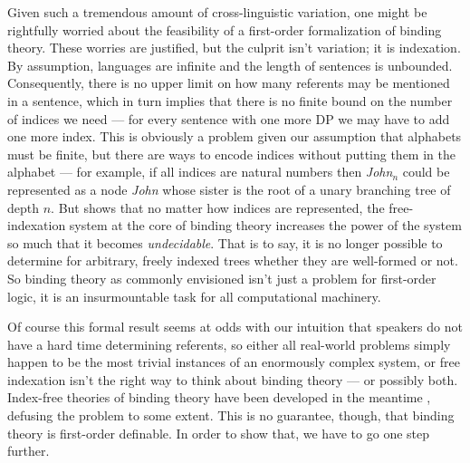 Given such a tremendous amount of cross-linguistic variation, one might be rightfully worried about the feasibility of a first-order formalization of binding theory.
These worries are justified, but the culprit isn't variation; it is indexation.
By assumption, languages are infinite and the length of sentences is unbounded.
Consequently, there is no upper limit on how many referents may be mentioned in a sentence, which in turn implies that there is no finite bound on the number of indices we need --- for every sentence with one more DP we may have to add one more index.
This is obviously a problem given our assumption that alphabets must be finite, but there are ways to encode indices without putting them in the alphabet --- for example, if all indices are natural numbers then \emph{John$_n$} could be represented as a node \emph{John} whose sister is the root of a unary branching tree of depth $n$.
But \citet{Rogers98} shows that no matter how indices are represented, the free-indexation system at the core of binding theory increases the power of the system so much that it becomes \emph{undecidable}.
That is to say, it is no longer possible to determine for arbitrary, freely indexed trees whether they are well-formed or not.
So binding theory as commonly envisioned isn't just a problem for first-order logic, it is an insurmountable task for all computational machinery.

Of course this formal result seems at odds with our intuition that speakers do not have a hard time determining referents, so either all real-world problems simply happen to be the most trivial instances of an enormously complex system, or free indexation isn't the right way to think about binding theory --- or possibly both.
Index-free theories of binding theory have been developed in the meantime \citep{Bonato05,Kobele06}, defusing the problem to some extent.
This is no guarantee, though, that binding theory is first-order definable.
In order to show that, we have to go one step further.

